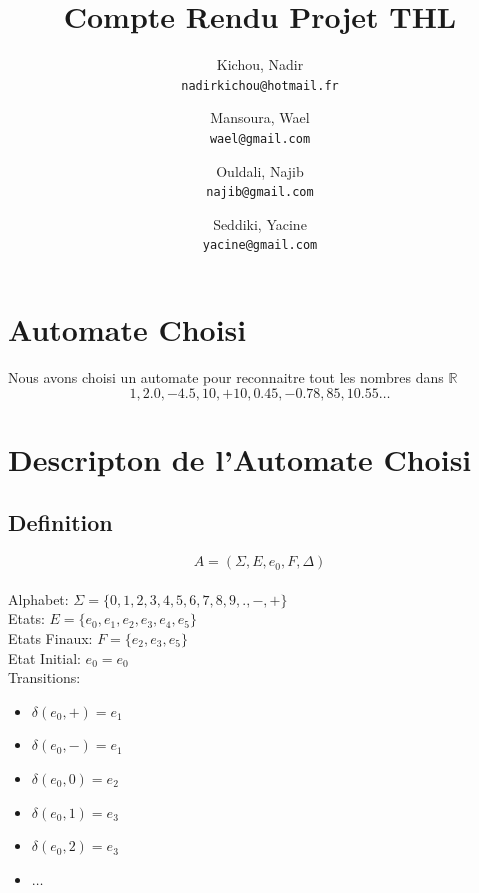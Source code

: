 \documentclass{article}
\title{Compte Rendu Projet THL}
\author{
  Kichou, Nadir\\
  \texttt{nadirkichou@hotmail.fr}
  \and
  Mansoura, Wael\\
  \texttt{wael@gmail.com}
   \and
  Ouldali, Najib\\
  \texttt{najib@gmail.com}
  \and
  Seddiki, Yacine\\
  \texttt{yacine@gmail.com}
}
\begin{document}
\maketitle

\pagebreak

\setcounter{tocdepth}{1} %

\tableofcontents

\pagebreak

\section{Automate Choisi}

Nous avons choisi un automate pour reconnaitre tout les nombres dans $\mathbb{R}$ $$1, 2.0, -4.5, 10, +10, 0.45, -0.78, 85, 10.55 \ldots$$

\section{Descripton de l'Automate Choisi}

\subsection{Definition}

$$A = (\Sigma, E, e_0, F, \Delta)$$\\
Alphabet: $\Sigma = \{0, 1, 2, 3, 4, 5, 6, 7, 8, 9, ., -, +\}$\\
Etats: $E = \{e_0, e_1, e_2, e_3, e_4, e_5\}$\\
Etats Finaux: $F = \{e_2, e_3, e_5\}$\\
Etat Initial: $e_0 = e_0$\\
Transitions:
\begin{multicols}{2}
\begin{itemize}
  \item \tab $\delta(e_0, +) = e_1$
  \item \tab $\delta(e_0, -) = e_1$
  \item \tab $\delta(e_0, 0) = e_2$
  \item \tab $\delta(e_0, 1) = e_3$
  \item \tab $\delta(e_0, 2) = e_3$
  \item \tab $\ldots$
\end{itemize}
\end{multicols}
\end{document}
